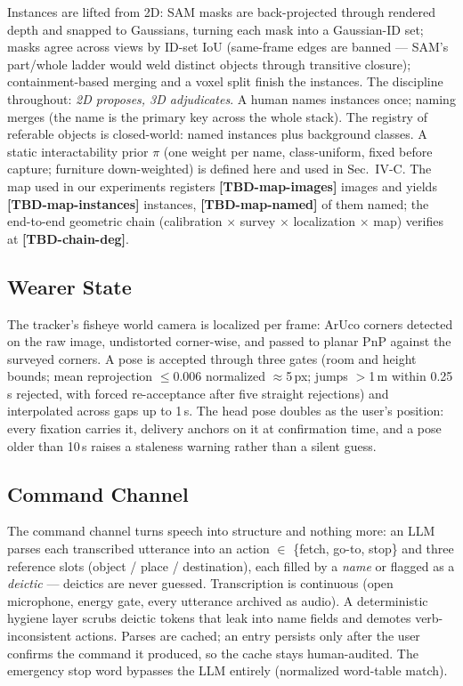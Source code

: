 \documentclass[letterpaper, 10 pt, conference]{ieeeconf}  %
\newcommand{\TBD}[1]{\textbf{\color{red}[TBD-#1]}}
\begin{document}
Instances are lifted from 2D: SAM masks are back-projected through
rendered depth and snapped to Gaussians, turning each mask into a
Gaussian-ID set; masks agree across views by ID-set IoU (same-frame
edges are banned --- SAM's part/whole ladder would weld distinct
objects through transitive closure); containment-based merging and a
voxel split finish the instances. The discipline throughout:
\emph{2D proposes, 3D adjudicates}. A human names instances once;
naming merges (the name is the primary key across the whole stack).
The registry of referable objects is closed-world: named instances
plus background classes. A static interactability prior $\pi$
(one weight per name, class-uniform, fixed before capture; furniture
down-weighted) is defined here and used in Sec.~IV-C.
The map used in our experiments registers \TBD{map-images} images and
yields \TBD{map-instances} instances, \TBD{map-named} of them named;
the end-to-end geometric chain (calibration $\times$ survey $\times$
localization $\times$ map) verifies at \TBD{chain-deg}.

\subsection{Wearer State}
The tracker's fisheye world camera is localized per frame: ArUco
corners detected on the raw image, undistorted corner-wise, and
passed to planar PnP against the surveyed corners. A pose is
accepted through three gates (room and height bounds; mean
reprojection $\le$0.006 normalized $\approx$5\,px; jumps $>$1\,m
within 0.25\,s rejected, with forced re-acceptance after five
straight rejections) and interpolated across gaps up to 1\,s. The
head pose doubles as the user's position: every fixation carries it,
delivery anchors on it at confirmation time, and a pose older than
10\,s raises a staleness warning rather than a silent guess.

\subsection{Command Channel}
The command channel turns speech into structure and nothing more: an
LLM parses each transcribed utterance into an action $\in$ \{fetch,
go-to, stop\} and three reference slots (object / place /
destination), each filled by a \emph{name} or flagged as a
\emph{deictic} --- deictics are never guessed. Transcription is
continuous (open microphone, energy gate, every utterance archived
as audio). A deterministic hygiene layer scrubs deictic tokens that
leak into name fields and demotes verb-inconsistent actions. Parses
are cached; an entry persists only after the user confirms the
command it produced, so the cache stays human-audited. The emergency
stop word bypasses the LLM entirely (normalized word-table match).
\end{document}
